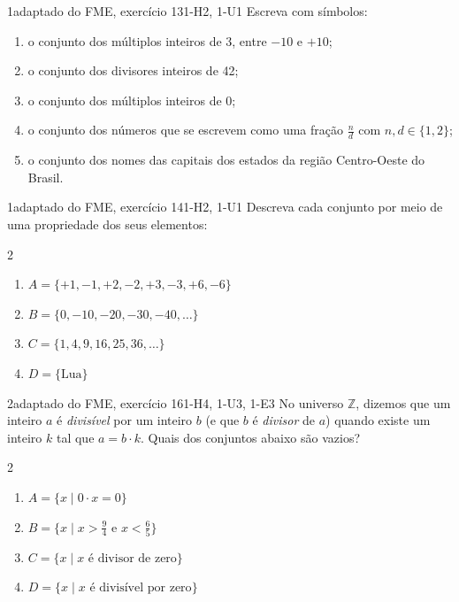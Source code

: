\begin{questao}{1}{adaptado do FME, exercício 13}{1-H2, 1-U1}\label{u1:fme13}
Escreva com símbolos:
\begin{enumerate}[label=\alph*)]
  \item o conjunto dos múltiplos inteiros de 3, entre $-10$ e $+10$;
  \item o conjunto dos divisores inteiros de 42;
  \item o conjunto dos múltiplos inteiros de 0;
  \item o conjunto dos números que se escrevem como uma fração $\frac{n}{d}$ com $n,d\in\{1,2\}$;
  \item o conjunto dos nomes das capitais dos estados da região Centro-Oeste do Brasil.
\end{enumerate}
\end{questao}

\begin{questao}{1}{adaptado do FME, exercício 14}{1-H2, 1-U1}\label{u1:fme14}
Descreva cada conjunto por meio de uma propriedade dos seus elementos:
\begin{multicols}{2}
\begin{enumerate}[label=\alph*)]
  \item $A=\{+1,-1,+2,-2,+3,-3,+6,-6\}$
  \item $B=\{0,-10,-20,-30,-40,\ldots\}$
  \item $C=\{1,4,9,16,25,36,\ldots\}$
  \item $D=\{\text{Lua}\}$
\end{enumerate}
\end{multicols}
\end{questao}

\begin{questao}{2}{adaptado do FME, exercício 16}{1-H4, 1-U3, 1-E3}\label{u1:vazios}
No universo $\mathbb{Z}$, dizemos que um inteiro $a$ é \emph{divisível} por um inteiro $b$ (e que $b$ é \emph{divisor} de $a$) quando existe um inteiro $k$ tal que $a=b\cdot k$. Quais dos conjuntos abaixo são vazios?
\begin{multicols}{2}
\begin{enumerate}[label=\alph*)]
  \item $A=\{x\mid 0\cdot x=0\}$
  \item $B=\{x\mid x>\frac94\text{ e }x<\frac65\}$
  \item $C=\{x\mid x\text{ é divisor de zero}\}$
  \item $D=\{x\mid x\text{ é divisível por zero}\}$
\end{enumerate}
\end{multicols}
\end{questao}

